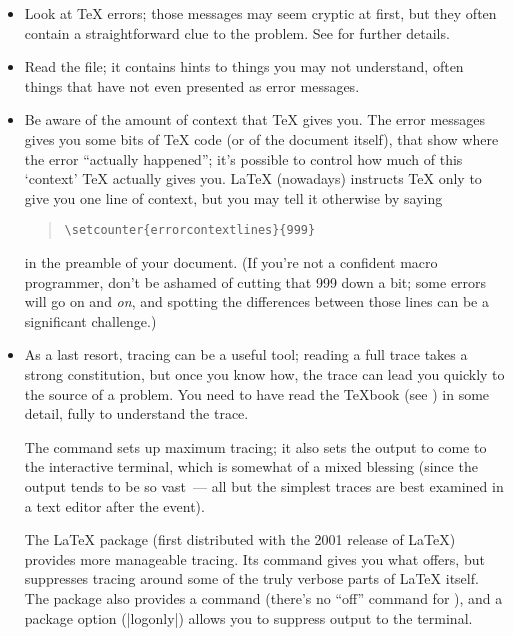 \begin{itemize}
\item Look at \TeX{} errors; those messages may seem cryptic at first,
  but they often contain a straightforward clue to the problem.  See
   for further
  details. 
\item Read the  file; it contains hints to things you may
  not understand, often things that have not even presented as error
  messages.
\item Be aware of the amount of context that \TeX{} gives you.  The
  error messages gives you some bits of \TeX{} code (or of the
  document itself), that show where the error ``actually happened'';
  it's possible to control how much of this `context' \TeX{} actually
  gives you.  \LaTeX{} (nowadays) instructs \TeX{} only to give you
  one line of context, but you may tell it otherwise by saying
\begin{quote}
\begin{verbatim}
\setcounter{errorcontextlines}{999}
\end{verbatim}
\end{quote}
  in the preamble of your document.  (If you're not a confident macro
  programmer, don't be ashamed of cutting that 999 down a bit; some
  errors will go on and \emph{on}, and spotting the differences
  between those lines can be a significant challenge.)
\item As a last resort, tracing can be a useful tool; reading a full
  \AllTeX{} trace takes a strong constitution, but once you know how,
  the trace can lead you quickly to the source of a problem.  You need
  to have read the \TeX{}book (see
  ) in some detail, fully
  to understand the trace.
  
  The command  sets up maximum tracing; it also sets
  the output to come to the interactive terminal, which is somewhat of
  a mixed blessing (since the output tends to be so vast~--- all but
  the simplest traces are best examined in a text editor after the event).

  The \LaTeX{}  package (first distributed with the
  2001 release of \LaTeX{}) provides more manageable tracing.  Its
   command gives you what  offers, but
  suppresses tracing around some of the truly verbose parts of
  \LaTeX{} itself.  The package also provides a 
  command (there's no ``off'' command for ), and a
  package option (|logonly|) allows you to suppress output to the
  terminal.
\end{itemize}
